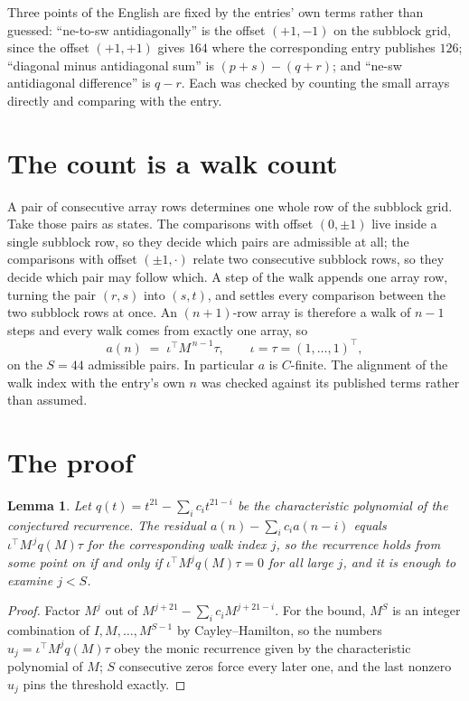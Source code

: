 \documentclass[11pt,a4paper]{article}
\theoremstyle{plain}
\newtheorem{lemma}[theorem]{Lemma}
\theoremstyle{definition}
\begin{document}
Three points of the English are fixed by the entries' own terms rather than guessed:
``ne-to-sw antidiagonally'' is the offset $(+1,-1)$ on the subblock grid, since the offset
$(+1,+1)$ gives $164$ where the corresponding entry publishes $126$; ``diagonal minus
antidiagonal sum'' is $(p+s)-(q+r)$; and ``ne-sw antidiagonal difference'' is $q-r$. Each was
checked by counting the small arrays directly and comparing with the entry.

\section{The count is a walk count}

A pair of consecutive array rows determines one whole row of the subblock grid. Take those
pairs as states. The comparisons with offset $(0,\pm1)$ live inside a single subblock row, so
they decide which pairs are admissible at all; the comparisons with offset $(\pm1,\cdot)$
relate two consecutive subblock rows, so they decide which pair may follow which. A step of the
walk appends one array row, turning the pair $(r,s)$ into $(s,t)$, and settles every comparison
between the two subblock rows at once. An $(n+1)$-row array is therefore a walk of $n-1$ steps
and every walk comes from exactly one array, so
\[
a(n)\;=\;\iota^{\!\top}M^{\,n-1}\tau,\qquad \iota=\tau=(1,\dots,1)^{\!\top},
\]
on the $S=44$ admissible pairs. In particular $a$ is $C$-finite. The alignment of the walk
index with the entry's own $n$ was checked against its published terms rather than assumed.

\section{The proof}

\begin{lemma}\label{lem:crit}
Let $q(t)=t^{21}-\sum_i c_it^{21-i}$ be the characteristic polynomial of the
conjectured recurrence. The residual $a(n)-\sum_ic_ia(n-i)$ equals
$\iota^{\!\top}M^{\,j}q(M)\tau$ for the corresponding walk index $j$, so the recurrence
holds from some point on if and only if $\iota^{\!\top}M^{j}q(M)\tau=0$ for all large $j$,
and it is enough to examine $j<S$.
\end{lemma}

\begin{proof}
Factor $M^{j}$ out of $M^{j+21}-\sum_ic_iM^{j+21-i}$. For the bound, $M^{S}$
is an integer combination of $I,M,\dots,M^{S-1}$ by Cayley--Hamilton, so the numbers
$u_j=\iota^{\!\top}M^{j}q(M)\tau$ obey the monic recurrence given by the characteristic
polynomial of $M$; $S$ consecutive zeros force every later one, and the last nonzero $u_j$
pins the threshold exactly.
\end{proof}
\end{document}
